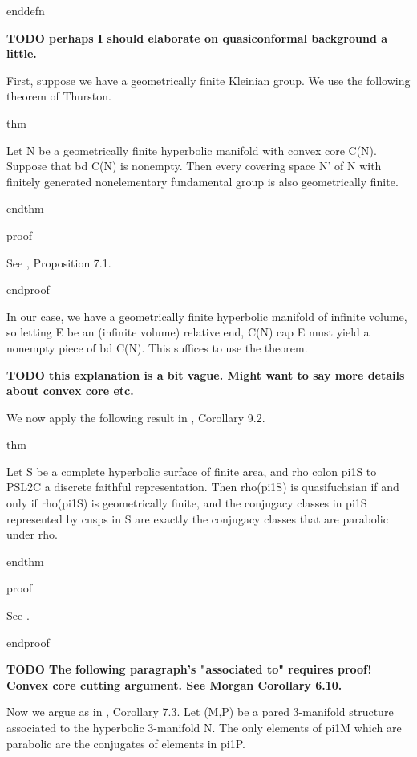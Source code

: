 enddefn

\textbf{TODO perhaps I should elaborate on quasiconformal background a little.}

First, suppose we have a geometrically finite Kleinian group. We use the
following theorem of Thurston.

thm

Let N be a geometrically finite hyperbolic manifold with convex core C(N).
Suppose that bd C(N) is nonempty. Then every covering space N' of N with
finitely generated nonelementary fundamental group is also geometrically
finite.

endthm

proof

See \cite{Mo}, Proposition 7.1.

endproof

In our case, we have a geometrically finite hyperbolic manifold of infinite
volume, so letting E be an (infinite volume) relative end, C(N) cap E must
yield a nonempty piece of bd C(N). This suffices to use the theorem.

\textbf{TODO this explanation is a bit vague. Might want to say more details
about convex core etc.}

We now apply the following result in \cite{Mo}, Corollary 9.2.

thm

Let S be a complete hyperbolic surface of finite area, and rho colon pi1S to
PSL2C a discrete faithful representation. Then rho(pi1S) is quasifuchsian if
and only if rho(pi1S) is geometrically finite, and the conjugacy classes in
pi1S represented by cusps in S are exactly the conjugacy classes that are
parabolic under rho.

endthm

proof

See \cite{Mo}.


endproof


\textbf{TODO The following paragraph's "associated to" requires proof! Convex
core cutting argument. See Morgan Corollary 6.10.}

Now we argue as in \cite{Mo}, Corollary 7.3. Let (M,P) be a pared 3-manifold
structure associated to the hyperbolic 3-manifold N. The only elements of pi1M
which are parabolic are the conjugates of elements in pi1P.

